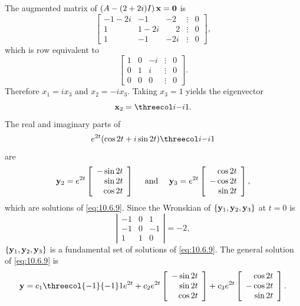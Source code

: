 \begin{examplesolution}
The augmented matrix of $\left(A-(2+2i)I\right){\bf x=0}$ is
\[
  \left[
  \begin{array}{ccrcc}
    -1-2i & -1   & -2           & \vdots & 0 \\
    1     & 1-2i & \phantom{-}2 & \vdots & 0 \\
    1     & -1   & -2i          & \vdots & 0
  \end{array}\right],
\]
which is row equivalent to
\[
  \left[
  \begin{array}{rrrcr}
    1 & 0 & -i & \vdots & 0 \\
    0 & 1 & i  & \vdots & 0 \\
    0 & 0 & 0  & \vdots & 0
  \end{array}\right].
\]
Therefore $x_{1}=ix_{3}$ and $x_{2}=-ix_{3}$. Taking $x_{3}=1$ yields the eigenvector
\[
  {\bf x}_{2}=\threecol i{-i}1. \]
The real and imaginary parts of
\[
  e^{2t}(\cos2t+i\sin2t)\threecol i{-i}1
\]
are
\[
  {\bf y}_{2}=e^{2t}\left[
  \begin{array}{r}
    -\sin2t \\
    \sin2t  \\
    \cos 2t
  \end{array}\right]\quad\mbox{ and }\quad{\bf y}_{3}=e^{2t}\left[
  \begin{array}{r}
    \cos2t  \\
    -\cos2t \\
    \sin 2t
  \end{array}\right],
\]
which are solutions of \eqref{eq:10.6.9}. Since the Wronskian of
$\{{\bf y}_{1},{\bf y}_{2},{\bf y}_{3}\}$ at $t=0$ is
\[
  \left|
  \begin{array}{rrr}
    -1 & 0 & 1  \\
    -1 & 0 & -1 \\
    1  & 1 & 0
  \end{array}\right|=-2,
\]
$\{{\bf y}_{1},{\bf y}_{2},{\bf y}_{3}\}$ is a fundamental set of solutions of \eqref{eq:10.6.9}.
The general solution of \eqref{eq:10.6.9} is
\[
  {\bf y}=c_{1}\threecol{-1}{-1}1e^{2t}+ c_{2}e^{2t}\left[
  \begin{array}{r}
    -\sin2t \\
    \sin2t  \\
    \cos 2t
  \end{array}\right]+ c_{3}e^{2t}\left[
  \begin{array}{r}
    \cos2t  \\
    -\cos2t \\
    \sin 2t
  \end{array}\right].
\]
\end{examplesolution}

